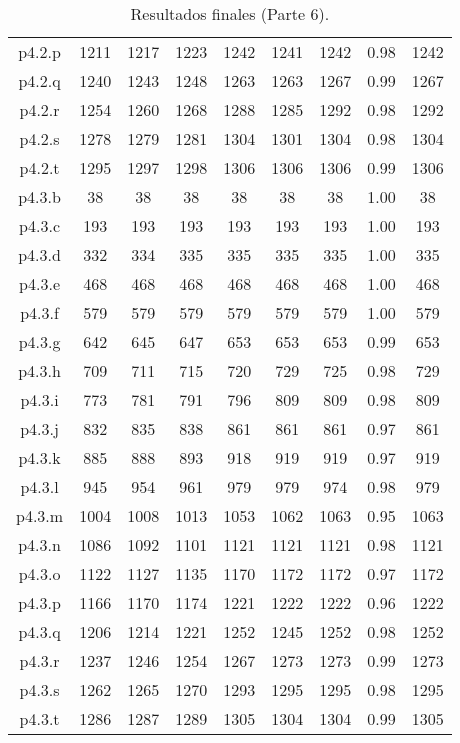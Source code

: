 \begin{table}
\begin{center}
\begin{tabular}{ |c|c|c|c|c|c|c|c|c| }
p4.2.p & 1211 & 1217 & 1223 & 1242 & 1241 & 1242 & 0.98 & 1242  \\
p4.2.q & 1240 & 1243 & 1248 & 1263 & 1263 & 1267 & 0.99 & 1267  \\
p4.2.r & 1254 & 1260 & 1268 & 1288 & 1285 & 1292 & 0.98 & 1292  \\
p4.2.s & 1278 & 1279 & 1281 & 1304 & 1301 & 1304 & 0.98 & 1304  \\
p4.2.t & 1295 & 1297 & 1298 & 1306 & 1306 & 1306 & 0.99 & 1306  \\
p4.3.b & 38 & 38 & 38 & 38 & 38 & 38 & 1.00 & 38  \\
p4.3.c & 193 & 193 & 193 & 193 & 193 & 193 & 1.00 & 193  \\
p4.3.d & 332 & 334 & 335 & 335 & 335 & 335 & 1.00 & 335  \\
p4.3.e & 468 & 468 & 468 & 468 & 468 & 468 & 1.00 & 468  \\
p4.3.f & 579 & 579 & 579 & 579 & 579 & 579 & 1.00 & 579  \\
p4.3.g & 642 & 645 & 647 & 653 & 653 & 653 & 0.99 & 653  \\
p4.3.h & 709 & 711 & 715 & 720 & 729 & 725 & 0.98 & 729  \\
p4.3.i & 773 & 781 & 791 & 796 & 809 & 809 & 0.98 & 809  \\
p4.3.j & 832 & 835 & 838 & 861 & 861 & 861 & 0.97 & 861  \\
p4.3.k & 885 & 888 & 893 & 918 & 919 & 919 & 0.97 & 919  \\
p4.3.l & 945 & 954 & 961 & 979 & 979 & 974 & 0.98 & 979  \\
p4.3.m & 1004 & 1008 & 1013 & 1053 & 1062 & 1063 & 0.95 & 1063  \\
p4.3.n & 1086 & 1092 & 1101 & 1121 & 1121 & 1121 & 0.98 & 1121  \\
p4.3.o & 1122 & 1127 & 1135 & 1170 & 1172 & 1172 & 0.97 & 1172  \\
p4.3.p & 1166 & 1170 & 1174 & 1221 & 1222 & 1222 & 0.96 & 1222  \\
p4.3.q & 1206 & 1214 & 1221 & 1252 & 1245 & 1252 & 0.98 & 1252  \\
p4.3.r & 1237 & 1246 & 1254 & 1267 & 1273 & 1273 & 0.99 & 1273  \\
p4.3.s & 1262 & 1265 & 1270 & 1293 & 1295 & 1295 & 0.98 & 1295  \\
p4.3.t & 1286 & 1287 & 1289 & 1305 & 1304 & 1304 & 0.99 & 1305  \\
\hline
\end{tabular}
\end{center}
\caption{Resultados finales (Parte 6).}
\label{tab:resultadosFinales6}
\end{table}



